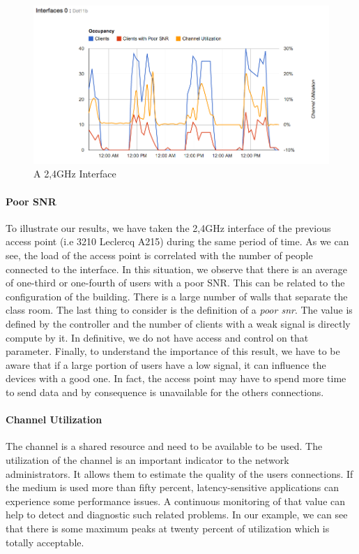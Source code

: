 \begin{figure}[H]
   \includegraphics[width=\textwidth]{Pictures/chapter5/interfaceLoad.png}
   \caption{A 2,4GHz Interface}
\end{figure}

\paragraph*{Poor SNR} To illustrate our results, we have taken the 2,4GHz interface of the previous access point (i.e 3210 Leclercq A215) during the same period of time. As we can see, the load of the access point is correlated with the number of people connected to the interface. In this situation, we observe that there is an average of one-third or one-fourth of users with a poor SNR. This can be related to the configuration of the building. There is a large number of walls that separate the class room. The last thing to consider is the definition of a \emph{poor snr}. The value is defined by the controller and the number of clients with a weak signal is directly compute by it. In definitive, we do not have access and control on that parameter. Finally, to understand the importance of this result, we have to be aware that if a large portion of users have a low signal, it can influence the devices with a good one. In fact, the access point may have to spend more time to send data and by consequence is unavailable for the others connections.

\paragraph*{Channel Utilization} The channel is a shared resource and need to be available to be used. The utilization of the channel is an important indicator to the network administrators. It allows them to estimate the quality of the users connections. If the medium is used more than fifty percent, latency-sensitive applications can experience some performance issues\cite{ciscoVowlan}. A continuous monitoring of that value can help to detect and diagnostic such related problems. In our example, we can see that there is some maximum peaks at twenty percent of utilization which is totally acceptable. 


